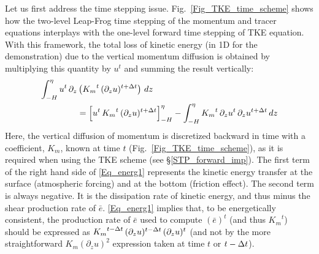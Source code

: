Let us first address the time stepping issue. Fig.~\ref{Fig_TKE_time_scheme} shows 
how the two-level Leap-Frog time stepping of the momentum and tracer equations interplays 
with the one-level forward time stepping of TKE equation. With this framework, the total loss 
of kinetic energy (in 1D for the demonstration) due to the vertical momentum diffusion is 
obtained by multiplying this quantity by $u^t$ and summing the result vertically:   
\begin{equation} \label{Eq_energ1}
\begin{split}
\int_{-H}^{\eta}  u^t \,\partial_z &\left( {K_m}^t \,(\partial_z u)^{t+\Delta t}  \right) \,dz   \\
&= \Bigl[  u^t \,{K_m}^t \,(\partial_z u)^{t+\Delta t} \Bigr]_{-H}^{\eta}          
 - \int_{-H}^{\eta}{ {K_m}^t \,\partial_z{u^t} \,\partial_z u^{t+\Delta t} \,dz }
\end{split}
\end{equation}
Here, the vertical diffusion of momentum is discretized backward in time 
with a coefficient, $K_m$, known at time $t$ (Fig.~\ref{Fig_TKE_time_scheme}), 
as it is required when using the TKE scheme (see \S\ref{STP_forward_imp}). 
The first term of the right hand side of \eqref{Eq_energ1} represents the kinetic energy 
transfer at the surface (atmospheric forcing) and at the bottom (friction effect). 
The second term is always negative. It is the dissipation rate of kinetic energy, 
and thus minus the shear production rate of $\bar{e}$. \eqref{Eq_energ1} 
implies that, to be energetically consistent, the production rate of $\bar{e}$ 
used to compute $(\bar{e})^t$ (and thus ${K_m}^t$) should be expressed as 
${K_m}^{t-\Delta t}\,(\partial_z u)^{t-\Delta t} \,(\partial_z u)^t$ (and not by the more straightforward 
$K_m \left( \partial_z u \right)^2$ expression taken at time $t$ or $t-\Delta t$).

